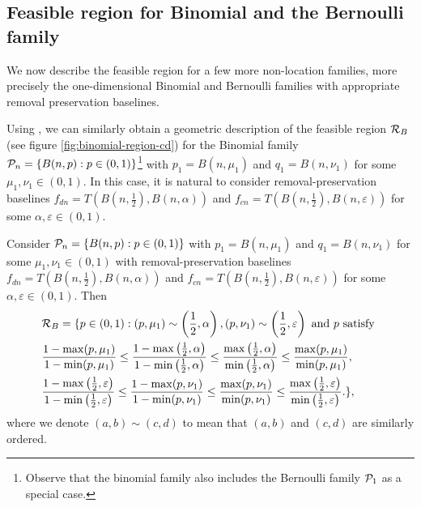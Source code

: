 \subsection{Feasible region for Binomial and the Bernoulli family}
We now describe the feasible region for a few more non-location families, more precisely the one-dimensional Binomial and Bernoulli families with appropriate removal preservation baselines.
\begin{remark}
    Using \citet[Complement 16, Chapter 10]{torgersen1991comparison}, we can similarly obtain a geometric description of the feasible region $\mathcal{R}_B$ (see figure \ref{fig:binomial-region-cd}) for the Binomial family $\mathcal{P}_n= \{B(n,p): p\in (0,1)\}$\footnote{Observe that the binomial family also includes the Bernoulli family $\mathcal{P}_1$ as a special case.} with $p_1= B(n, \mu_1)$ and $q_1= B(n,\nu_1)$ for some $\mu_1, \nu_1 \in  (0,1)$. In this case, it is natural to consider removal-preservation baselines  $f_{dn}= T(B(n,\frac{1}{2}), B(n, \alpha))$ and $f_{cn}= T(B(n,\frac{1}{2}), B(n, \varepsilon))$  for some $\alpha, \varepsilon \in  (0,1)$.
\end{remark}
\begin{lemma} \label{lem:binomregion}
    Consider $\mathcal{P}_n= \{B(n,p): p\in (0,1)\}$ with $p_1= B(n, \mu_1)$ and $q_1= B(n,\nu_1)$ for some $\mu_1, \nu_1 \in  (0,1)$ with removal-preservation baselines  $f_{dn}= T\left(B\left(n,\frac{1}{2}\right), B(n, \alpha)\right)$ and $f_{cn}= T\left(B\left(n,\frac{1}{2}\right), B(n, \varepsilon)\right)$  for some $\alpha, \varepsilon \in  (0,1)$. Then
    \begin{align}
       & \mathcal{R}_{B}= \{p\in (0,1): (p,\mu_1) \sim \left(\frac{1}{2}, \alpha\right),  (p,\nu_1) \sim \left(\frac{1}{2}, \varepsilon \right)  \text{ and } p \text{ satisfy } 
        \\
        &
        \frac{1-\max(p,\mu_1)}{1-\min(p,\mu_1)} \leq \frac{1-\max\left(\frac{1}{2},\alpha\right)}{1-\min\left(\frac{1}{2},\alpha\right)} \leq \frac{\max\left(\frac{1}{2},\alpha\right)}{\min\left(\frac{1}{2},\alpha\right)} \leq \frac{\max(p,\mu_1)}{\min(p,\mu_1)},
        \\
        &
        \frac{1-\max\left(\frac{1}{2},\varepsilon\right)}{1-\min\left(\frac{1}{2},\varepsilon\right)} \leq \frac{1-\max(p,\nu_1)}{1-\min(p,\nu_1)} \leq \frac{\max(p,\nu_1)}{\min(p,\nu_1)} \leq \frac{\max\left(\frac{1}{2},\varepsilon\right)}{\min\left(\frac{1}{2},\varepsilon\right)}.\}, 
    \end{align}
    where we denote $(a,b) \sim (c,d)$ to mean that $(a,b)$ and $(c,d)$ are similarly ordered.
\end{lemma}
